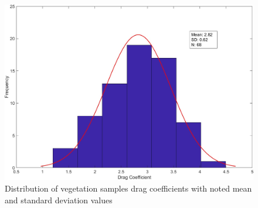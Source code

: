 \documentclass[12pt]{article}
\begin{document}
\begin{figure}[!h]
\includegraphics[width=\textwidth,keepaspectratio]{Picture11.jpg}
	\caption{Distribution of vegetation samples drag coefficients with noted mean and standard deviation values}
	\label{fig:Histogram}
\end{figure}
\end{document}
